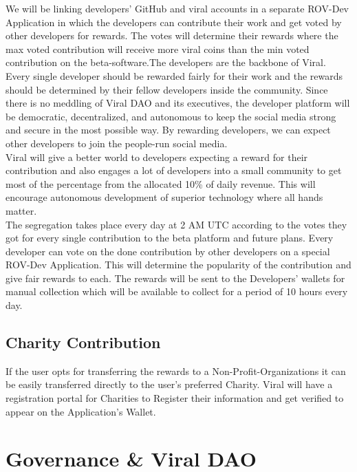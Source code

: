 \documentclass[10pt]{article}
\begin{document}
We will be linking developers' GitHub and viral accounts in a separate ROV-Dev Application in which the developers can contribute their work and get voted by other developers for rewards. The votes will determine their rewards where the max voted contribution will receive more viral coins than the min voted contribution on the beta-software.The developers are the backbone of Viral. Every single developer should be rewarded fairly for their work and the rewards should be determined by their fellow developers inside the community. Since there is no meddling of Viral DAO and its executives, the developer platform will be democratic, decentralized, and autonomous to keep the social media strong and secure in the most possible way. By rewarding developers, we can expect other developers to join the people-run social media.\\

Viral will give a better world to developers expecting a reward for their contribution and also engages a lot of developers into a small community to get most of the percentage from the allocated 10\% of daily revenue. This will encourage autonomous development of superior technology where all hands matter. \\

The segregation takes place every day at 2 AM UTC according to the votes they got for every single contribution to the beta platform and future plans. Every developer can vote on the done contribution by other developers on a special ROV-Dev Application. This will determine the popularity of the contribution and give fair rewards to each. The rewards will be sent to the Developers' wallets for manual collection which will be available to collect for a period of 10 hours every day.\\

\subsection{Charity Contribution}

If the user opts for transferring the rewards to a Non-Profit-Organizations it can be easily transferred directly to the user's preferred Charity. Viral will have a registration portal for Charities to Register their information and get verified to appear on the Application's Wallet.\\ 

\section{Governance \& Viral DAO}
\end{document}

